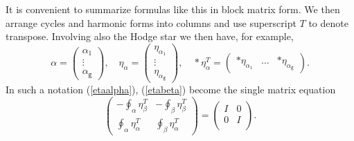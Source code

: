 \documentclass[reqno,12pt]{article}
\theoremstyle{plain}
\theoremstyle{definition}
\numberwithin{equation}{section}
\numberwithin{figure}{section}
\begin{document}
It is convenient to summarize formulas like this in block matrix form. We then arrange cycles and harmonic forms into columns
and use superscript $T$ to denote transpose. Involving also the Hodge star we then have, for example,
\begin{equation}\label{block}
\alpha=
\left(\begin{array}{c}
{\alpha_1}\\
\vdots\\
{\alpha_\texttt{g}}
\end{array}\right),
\quad
\eta_\alpha=
\left(\begin{array}{c}
\eta_{\alpha_1}\\
\vdots\\
\eta_{\alpha_\texttt{g}}
\end{array}\right),
\quad
*\eta_\alpha^T=
\left(\begin{array}{ccc}
*\eta_{\alpha_1}&
\dots &
*\eta_{\alpha_\texttt{g}}
\end{array}\right).
\end{equation}
In such a notation (\ref{etaalpha}), (\ref{etabeta}) become the single matrix equation
\begin{equation}\label{periods}
\left( \begin{array}{cc}
-\oint_{\alpha} \eta_{\beta}^T& -\oint_{\beta} \eta_{\beta}^T\\
\oint_{\alpha} \eta_{\alpha}^T & \oint_{\beta} \eta_{\alpha}^T 
\end{array} \right)
=\left( \begin{array}{cc}
                                            I & 0  \\
                                             0 & I  \\
\end{array} \right).
\end{equation}
\end{document}
